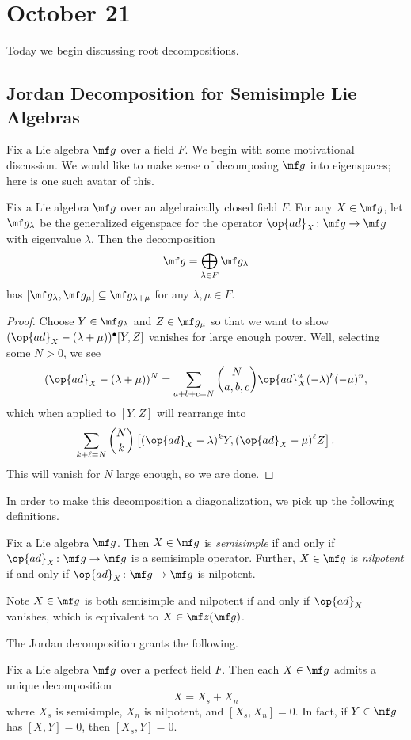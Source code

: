 \documentclass[../notes.tex]{subfiles}
\begin{document}
\section{October 21}
Today we begin discussing root decompositions.

\subsection{Jordan Decomposition for Semisimple Lie Algebras}
Fix a Lie algebra $\mf g$ over a field $F$. We begin with some motivational discussion. We would like to make sense of decomposing $\mf g$ into eigenspaces; here is one such avatar of this.
\begin{lemma} \label{lem:decompose-eigenspace-lie-alg}
	Fix a Lie algebra $\mf g$ over an algebraically closed field $F$. For any $X\in\mf g$, let $\mf g_\lambda$ be the generalized eigenspace for the operator $\op{ad}_X\colon\mf g\to\mf g$ with eigenvalue $\lambda$. Then the decomposition
	\[\mf g=\bigoplus_{\lambda\in F}\mf g_\lambda\]
	has $[\mf g_\lambda,\mf g_\mu]\subseteq\mf g_{\lambda+\mu}$ for any $\lambda,\mu\in F$.
\end{lemma}
\begin{proof}
	Choose $Y\in\mf g_\lambda$ and $Z\in\mf g_\mu$ so that we want to show $({\op{ad}_X}-(\lambda+\mu))^\bullet[Y,Z]$ vanishes for large enough power. Well, selecting some $N>0$, we see
	\[({\op{ad}_X}-(\lambda+\mu))^N=\sum_{a+b+c=N}\binom{N}{a,b,c}{\op{ad}_X^a}(-\lambda)^b(-\mu)^n,\]
	which when applied to $[Y,Z]$ will rearrange into
	\[\sum_{k+\ell=N}\binom Nk\left[({\op{ad}_X}-\lambda)^kY,({\op{ad}_X}-\mu)^\ell Z\right].\]
	This will vanish for $N$ large enough, so we are done.
\end{proof}
In order to make this decomposition a diagonalization, we pick up the following definitions.
\begin{defihelper}  
	Fix a Lie algebra $\mf g$. Then $X\in\mf g$ is \textit{semisimple} if and only if $\op{ad}_X\colon\mf g\to\mf g$ is a semisimple operator. Further, $X\in\mf g$ is \textit{nilpotent} if and only if $\op{ad}_X\colon\mf g\to\mf g$ is nilpotent.
\end{defihelper}
\begin{remark}
	Note $X\in\mf g$ is both semisimple and nilpotent if and only if $\op{ad}_X$ vanishes, which is equivalent to $X\in\mf z(\mf g)$.
\end{remark}
The Jordan decomposition grants the following.
\begin{proposition} \label{prop:ss-jordan}
	Fix a Lie algebra $\mf g$ over a perfect field $F$. Then each $X\in\mf g$ admits a unique decomposition
	\[X=X_s+X_n\]
	where $X_s$ is semisimple, $X_n$ is nilpotent, and $[X_s,X_n]=0$. In fact, if $Y\in\mf g$ has $[X,Y]=0$, then $[X_s,Y]=0$.
\end{proposition}
\end{document}
